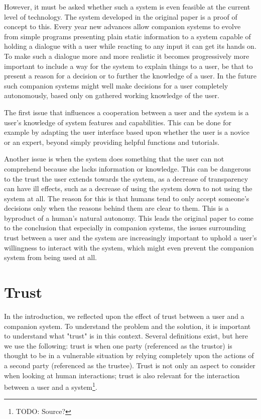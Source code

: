 \documentclass[a4paper]{article}
\begin{document}
However, it must be asked whether such a system is even feasible at the current level of technology. The system developed in the original paper is a proof of concept to this. Every year new advances allow companion systems to evolve from simple programs presenting plain static information to a system capable of holding a dialogue with a user while reacting to any input it can get its hands on. To make such a dialogue more and more realistic it becomes progressively more important to include a way for the system to explain things to a user, be that to present a reason for a decision or to further the knowledge of a user. In the future such companion systems might well make decisions for a user completely autonomously, based only on gathered working knowledge of the user.

The first issue that influences a cooperation between a user and the system is a user's knowledge of system features and capabilities. This can be done for example by adapting the user interface based upon whether the user is a novice or an expert, beyond simply providing helpful functions and tutorials.

Another issue is when the system does something that the user can not comprehend because she lacks information or knowledge. This can be dangerous to the trust the user extends towards the system, as a decrease of transparency can have ill effects, such as a decrease of using the system down to not using the system at all. The reason for this is that humans tend to only accept someone's decisions only when the reasons behind them are clear to them. This is a byproduct of a human's natural autonomy. This leads the original paper to come to the conclusion that especially in companion systems, the issues surrounding trust between a user and the system are increasingly important to uphold a user's willingness to interact with the system, which might even prevent the companion system from being used at all.

\section{Trust}

In the introduction, we reflected upon the effect of trust between a user and a companion system. To understand the problem and the solution, it is important to understand what "trust" is in this context. Several definitions exist, but here we use the following: trust is when one party (referenced as the trustor) is thought to be in a vulnerable situation by relying completely upon the actions of a second party (referenced as the trustee). Trust is not only an aspect to consider when looking at human interactions; trust is also relevant for the interaction between a user and a system\footnote{TODO: Source?}.
\end{document}
